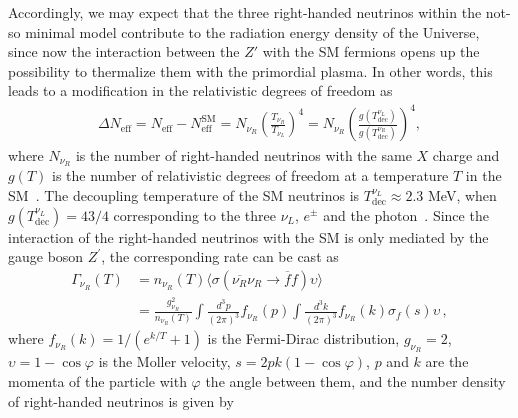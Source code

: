 \documentclass[12pt]{article}
\begin{document}
%




Accordingly, we may expect that 
the three right-handed neutrinos within the not-so minimal model
contribute to the radiation energy density of the Universe, since now   the interaction between the $Z'$ with the SM fermions  opens up the possibility to thermalize them with the primordial plasma.   
In other words, this leads to a modification in the relativistic degrees of freedom as~\cite{Anchordoqui:2012qu,Anchordoqui:2011nh}
%
\begin{align}
    \Delta N_{\text{eff}} = N_{\text{eff}} - N^{\text{SM}}_{\text{eff}} = N_{\nu_R} \left( \frac{T_{\nu_{R}}}{T_{\nu_{L}}} \right)^{4} = N_{\nu_R} \left( \frac{g(T^{\nu_{L}}_{\text{dec}})}{g(T^{\nu_{R}}_{\text{dec}})} \right)^{4},
\end{align}
%
where $N_{\nu_R}$ is the number of right-handed neutrinos with the same $X$ charge and $g(T)$ is the number of relativistic degrees of freedom at a temperature $T$ in the SM~\cite{Aghanim:2018eyx}. The decoupling temperature of the SM neutrinos is $ T^{\nu_{L}}_{\text{dec}} \approx 2.3 $ MeV, when $g(T^{\nu_{L}}_{ \text{dec}}) = 43/4$ corresponding to the three $\nu_{L}$, $e^{\pm} $ and the photon~\cite{Kolb:1990vq,Enqvist:1991gx}. Since the interaction of the right-handed neutrinos with the SM is only mediated by the gauge boson $Z^{\prime} $, the corresponding rate can be cast as~\cite{SolagurenBeascoa:2012cz}
%
\begin{align}
    \Gamma_{\nu_R} (T) &= n_{\nu_R}(T) \langle \sigma(\overline{\nu_{R}} \nu_{R} \to \overline{f} f) \upsilon \rangle \, \nonumber\\
    &= \frac{g^{2}_{\nu_R}}{n_{\nu_R}(T)} \int \frac{d^{3} p}{(2 \pi)^{3}} f_{\nu_R}(p) \int \frac{d^{3} k}{(2 \pi)^{3}} f_{\nu_R}(k) \sigma_{f}(s) \upsilon\,,
\end{align}
%
where $f_{\nu_R}(k)=1/(e^{k/T}+1)$ is the Fermi-Dirac distribution, $g_{\nu_R} = 2$, $\upsilon = 1-\cos{\varphi}$ is the Moller velocity, $s = 2 p k (1-\cos{\varphi})$, $p$ and $k$ are the momenta of the particle with $\varphi$ the angle between them, and the number density of right-handed neutrinos is given by
\end{document}
